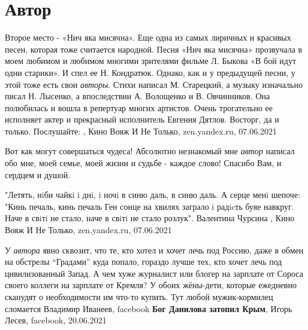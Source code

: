  
 
 
 
 
\chapter{Автор}

Второе место - «Нич яка мисячна». Еще одна из самых лиричных и красивых песен,
которая тоже считается народной. Песня «Нич яка мисячна» прозвучала в моем
любимом и любимом многими зрителями фильме Л. Быкова «В бой идут одни старики».
И спел ее Н. Кондратюк. Однако, как и у предыдущей песни, у этой тоже есть свои
\emph{авторы}. Стихи написал М. Старецкий, а музыку изначально писал Н. Лысенко, а
впоследствии А. Волощенко и В. Овчинников.  Она полюбилась и вошла в репертуар
многих артистов. Очень трогательно ее исполняет актер и прекрасный исполнитель
Евгения Дятлов. Восторг, да и только. Послушайте:
, 
Кино Вояж И Не Только, zen.yandex.ru, 07.06.2021

Вот как могут совершаться чудеса! Абсолютно незнакомый мне \emph{автор} написал
обо мне, моей семье, моей жизни и судьбе - каждое слово! Спасибо Вам, и сердцем
и душой.

"Летять, нiби чайкi i днi, i ночi
в синю даль, в синю даль.
А серце менi шепоче: "Кинь печаль, кинь печаль
Ген сонце на хвилях заграло
i радicть буяе навкруг.
Наче в свiтi не стало, наче в свiтi не стало розлук".
Валентина Чурсина
, 
Кино Вояж И Не Только, zen.yandex.ru, 07.06.2021

У \emph{автора} явно сквозит, что те, кто хотел и хочет лечь под Россию, даже в обмен
на обстрелы \enquote{Градами} куда попало, гораздо лучше тех, кто хочет лечь под
цивилизованный Запад. А чем хуже журналист или блогер на зарплате от Сороса
своего коллеги на зарплате от Кремля? У обоих жёны-дети, которые ежедневно
сканудят о необходимости им что-то купить. Тут любой мужик-кормилец сломается
Владимир Иванеев, facebook
\textbf{Бог Данилова затопил Крым}, Игорь Лесев, facebook, 20.06.2021

